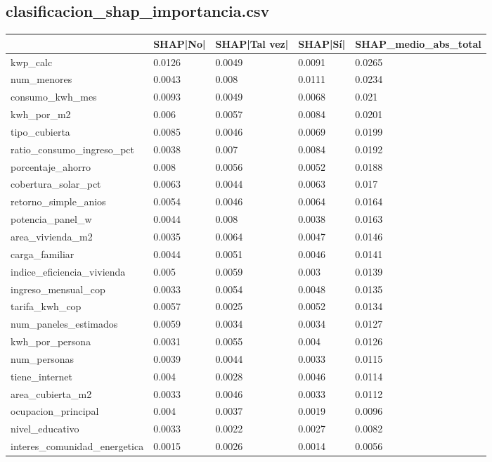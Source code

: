 \subsection*{clasificacion\_shap\_importancia.csv}
{\footnotesize\begin{longtable}{@{}p{}llll@{}}
\toprule
 & SHAP|No| & SHAP|Tal vez| & SHAP|Sí| & SHAP\_medio\_abs\_total \\
\midrule\endhead
kwp\_calc & 0.0126 & 0.0049 & 0.0091 & 0.0265 \\
num\_menores & 0.0043 & 0.008 & 0.0111 & 0.0234 \\
consumo\_kwh\_mes & 0.0093 & 0.0049 & 0.0068 & 0.021 \\
kwh\_por\_m2 & 0.006 & 0.0057 & 0.0084 & 0.0201 \\
tipo\_cubierta & 0.0085 & 0.0046 & 0.0069 & 0.0199 \\
ratio\_consumo\_ingreso\_pct & 0.0038 & 0.007 & 0.0084 & 0.0192 \\
porcentaje\_ahorro & 0.008 & 0.0056 & 0.0052 & 0.0188 \\
cobertura\_solar\_pct & 0.0063 & 0.0044 & 0.0063 & 0.017 \\
retorno\_simple\_anios & 0.0054 & 0.0046 & 0.0064 & 0.0164 \\
potencia\_panel\_w & 0.0044 & 0.008 & 0.0038 & 0.0163 \\
area\_vivienda\_m2 & 0.0035 & 0.0064 & 0.0047 & 0.0146 \\
carga\_familiar & 0.0044 & 0.0051 & 0.0046 & 0.0141 \\
indice\_eficiencia\_vivienda & 0.005 & 0.0059 & 0.003 & 0.0139 \\
ingreso\_mensual\_cop & 0.0033 & 0.0054 & 0.0048 & 0.0135 \\
tarifa\_kwh\_cop & 0.0057 & 0.0025 & 0.0052 & 0.0134 \\
num\_paneles\_estimados & 0.0059 & 0.0034 & 0.0034 & 0.0127 \\
kwh\_por\_persona & 0.0031 & 0.0055 & 0.004 & 0.0126 \\
num\_personas & 0.0039 & 0.0044 & 0.0033 & 0.0115 \\
tiene\_internet & 0.004 & 0.0028 & 0.0046 & 0.0114 \\
area\_cubierta\_m2 & 0.0033 & 0.0046 & 0.0033 & 0.0112 \\
ocupacion\_principal & 0.004 & 0.0037 & 0.0019 & 0.0096 \\
nivel\_educativo & 0.0033 & 0.0022 & 0.0027 & 0.0082 \\
interes\_comunidad\_energetica & 0.0015 & 0.0026 & 0.0014 & 0.0056 \\

\end{longtable}}
